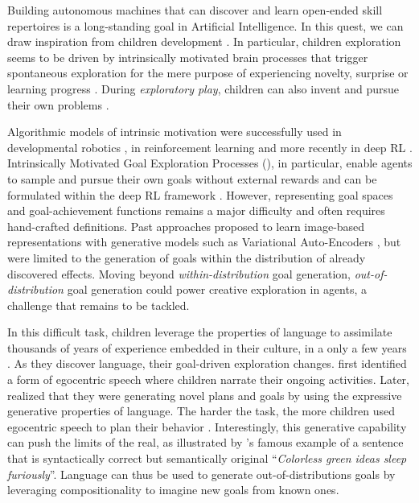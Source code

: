 Building autonomous machines that can discover and learn open-ended skill repertoires is a long-standing goal in Artificial Intelligence. In this quest, we can draw inspiration from children development \cite{cangelosi2015developmental}. In particular, children exploration seems to be driven by intrinsically motivated brain processes that trigger spontaneous exploration for the mere purpose of experiencing novelty, surprise or learning progress \cite{gopnik1999scientist, kaplan2007search, kidd2015psychology}. During \textit{exploratory play}, children can also invent and pursue their own problems \cite{chu2020exploratory}.

Algorithmic models of intrinsic motivation were successfully used in developmental robotics \cite{oudeyer2007intrinsic,baldassarre2013intrinsically}, in reinforcement learning \cite{chentanez2005intrinsically,schmidhuber2010formal} and more recently in deep RL \cite{bellemare2016unifying,pathak2017curiosity}. Intrinsically Motivated Goal Exploration Processes (\imgep), in particular, enable agents to sample and pursue their own goals without external rewards \cite{baranes2013active,forestier2016modular,imgep} and can be formulated within the deep RL framework \cite{florensa2017automatic,nair2018visual,curious,pong2019skew,venkattaramanujam2019self,racaniere2019automated}. However, representing goal spaces and goal-achievement functions remains a major difficulty and often requires hand-crafted definitions. Past approaches proposed to learn image-based representations with generative models such as Variational Auto-Encoders \cite{laversanne2018curiosity,nair2018visual}, but were limited to the generation of goals within the distribution of already discovered effects. Moving beyond \textit{within-distribution} goal generation, \textit{out-of-distribution} goal generation could power creative exploration in agents, a challenge that remains to be tackled. 

In this difficult task, children leverage the properties of language to assimilate thousands of years of experience embedded in their culture, in a only a few years \cite{Tomasello1999,Bruner1991}. As they discover language, their goal-driven exploration changes. \citet{Piaget1926} first identified a form of egocentric speech where children narrate their ongoing activities. Later, \citet{Vygotskii1978}
realized that they were generating novel plans and goals by using the expressive generative properties of language. The harder the task, the more children used egocentric speech to plan their behavior \citep[chap. 2]{Vygotskii1978}. Interestingly, this generative capability can push the limits of the real, as illustrated by \citet{Chomsky1957}’s famous example of a sentence that is syntactically correct but semantically original “\textit{Colorless green ideas sleep furiously}”. Language can thus be used to generate out-of-distributions goals by leveraging compositionality to imagine new goals from known ones.

